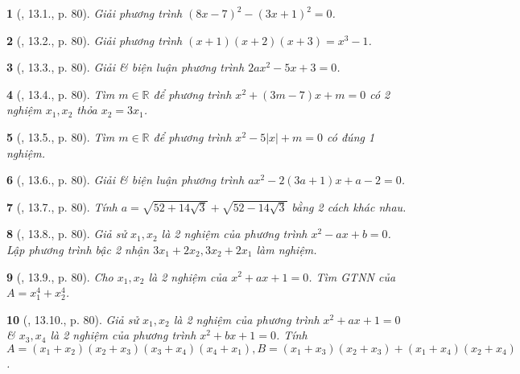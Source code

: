 \documentclass{article}
\newtheorem{baitoan}{}
\begin{document}
\begin{baitoan}[\cite{TLCT_THCS_Toan_9_dai_so}, 13.1., p. 80]
	Giải phương trình $(8x - 7)^2 - (3x + 1)^2 = 0$.
\end{baitoan}

\begin{baitoan}[\cite{TLCT_THCS_Toan_9_dai_so}, 13.2., p. 80]
	Giải phương trình $(x + 1)(x + 2)(x + 3) = x^3 - 1$.
\end{baitoan}

\begin{baitoan}[\cite{TLCT_THCS_Toan_9_dai_so}, 13.3., p. 80]
	Giải \& biện luận phương trình $2ax^2 - 5x + 3 = 0$.
\end{baitoan}

\begin{baitoan}[\cite{TLCT_THCS_Toan_9_dai_so}, 13.4., p. 80]
	Tìm $m\in\mathbb{R}$ để phương trình $x^2 + (3m - 7)x + m = 0$ có 2 nghiệm $x_1,x_2$ thỏa $x_2 = 3x_1$.
\end{baitoan}

\begin{baitoan}[\cite{TLCT_THCS_Toan_9_dai_so}, 13.5., p. 80]
	Tìm $m\in\mathbb{R}$ để phương trình $x^2 - 5|x| + m = 0$ có đúng 1 nghiệm.
\end{baitoan}

\begin{baitoan}[\cite{TLCT_THCS_Toan_9_dai_so}, 13.6., p. 80]
	Giải \& biện luận phương trình $ax^2 - 2(3a + 1)x + a - 2 = 0$.
\end{baitoan}

\begin{baitoan}[\cite{TLCT_THCS_Toan_9_dai_so}, 13.7., p. 80]
	Tính $a = \sqrt{52 + 14\sqrt{3}} + \sqrt{52 - 14\sqrt{3}}$ bằng 2 cách khác nhau.
\end{baitoan}

\begin{baitoan}[\cite{TLCT_THCS_Toan_9_dai_so}, 13.8., p. 80]
	Giả sử $x_1,x_2$ là 2 nghiệm của phương trình $x^2 - ax + b = 0$. Lập phương trình bậc 2 nhận $3x_1 + 2x_2,3x_2 + 2x_1$ làm nghiệm.
\end{baitoan}

\begin{baitoan}[\cite{TLCT_THCS_Toan_9_dai_so}, 13.9., p. 80]
	Cho $x_1,x_2$ là 2 nghiệm của $x^2 + ax + 1 = 0$. Tìm {\rm GTNN} của $A = x_1^4 + x_2^4$.
\end{baitoan}

\begin{baitoan}[\cite{TLCT_THCS_Toan_9_dai_so}, 13.10., p. 80]
	Giả sử $x_1,x_2$ là 2 nghiệm của phương trình $x^2 + ax + 1 = 0$ \& $x_3,x_4$ là 2 nghiệm của phương trình $x^2 + bx + 1 = 0$. Tính $A = (x_1 + x_2)(x_2 + x_3)(x_3 + x_4)(x_4 + x_1),B = (x_1 + x_3)(x_2 + x_3) + (x_1 + x_4)(x_2 + x_4)$.
\end{baitoan}
\end{document}
